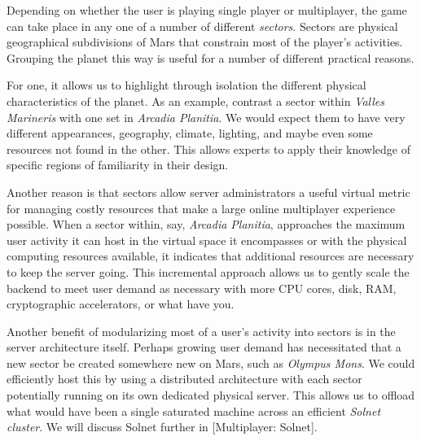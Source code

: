 

Depending on whether the user is playing single player or multiplayer, the game can take place in any one of a number of different {\it sectors}. Sectors are physical geographical subdivisions of Mars that constrain most of the player's activities. Grouping the planet this way is useful for a number of different practical reasons.

For one, it allows us to highlight through isolation the different physical characteristics of the planet. As an example, contrast a sector within {\it Valles Marineris} with one set in {\it Arcadia Planitia}. We would expect them to have very different appearances, geography, climate, lighting, and maybe even some resources not found in the other. This allows experts to apply their knowledge of specific regions of familiarity in their design.

Another reason is that sectors allow server administrators a useful virtual metric for managing costly resources that make a large online multiplayer experience possible. When a sector within, say, {\it Arcadia Planitia}, approaches the maximum user activity it can host in the virtual space it encompasses or with the physical computing resources available, it indicates that additional resources are necessary to keep the server going. This incremental approach allows us to gently scale the backend to meet user demand as necessary with more CPU cores, disk, RAM, cryptographic accelerators, or what have you. 

Another benefit of modularizing most of a user's activity into sectors is in the server architecture itself. Perhaps growing user demand has necessitated that a new sector be created somewhere new on Mars, such as {\it Olympus Mons}. We could efficiently host this by using a distributed architecture with each sector potentially running on its own dedicated physical server. This allows us to offload what would have been a single saturated machine across an efficient {\it Solnet cluster}. We will discuss Solnet further in [Multiplayer: Solnet].

